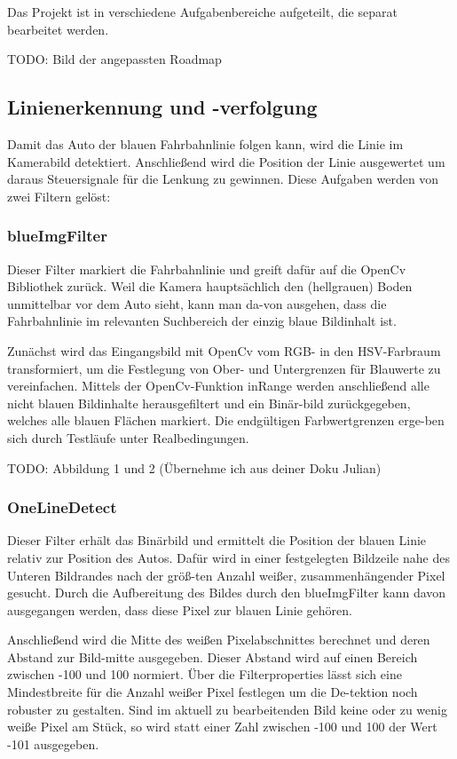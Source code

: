 \documentclass[12pt,a4paper]{report}
\begin{document}
Das Projekt ist in verschiedene Aufgabenbereiche aufgeteilt, die separat bearbeitet werden.

TODO: Bild der angepassten Roadmap

\subsection{Linienerkennung und -verfolgung}
Damit das Auto der blauen Fahrbahnlinie folgen kann, wird die Linie im Kamerabild detektiert. Anschließend wird die Position der Linie ausgewertet um daraus Steuersignale für die Lenkung zu gewinnen. Diese Aufgaben werden von zwei Filtern gelöst:

\subsubsection{blueImgFilter}
Dieser Filter markiert die Fahrbahnlinie und greift dafür auf die OpenCv Bibliothek zurück. Weil die Kamera hauptsächlich den (hellgrauen) Boden unmittelbar vor dem Auto sieht, kann man da-von ausgehen, dass die Fahrbahnlinie im relevanten Suchbereich der einzig blaue Bildinhalt ist.

Zunächst wird das Eingangsbild mit OpenCv vom RGB- in den HSV-Farbraum transformiert, um die Festlegung von Ober- und Untergrenzen für Blauwerte zu vereinfachen. Mittels der OpenCv-Funktion inRange werden anschließend alle nicht blauen Bildinhalte herausgefiltert und ein Binär-bild zurückgegeben, welches alle blauen Flächen markiert. Die endgültigen Farbwertgrenzen erge-ben sich durch Testläufe unter Realbedingungen.    

TODO: Abbildung 1 und 2 (Übernehme ich aus deiner Doku Julian)


\subsubsection{OneLineDetect}
Dieser Filter erhält das Binärbild und ermittelt die Position der blauen Linie relativ zur Position des Autos. Dafür wird in einer festgelegten Bildzeile nahe des Unteren Bildrandes nach der größ-ten Anzahl weißer, zusammenhängender Pixel gesucht. Durch die Aufbereitung des Bildes durch den blueImgFilter kann davon ausgegangen werden, dass diese Pixel zur blauen Linie gehören. 

Anschließend wird die Mitte des weißen Pixelabschnittes berechnet und deren Abstand zur Bild-mitte ausgegeben. Dieser Abstand wird auf einen Bereich zwischen -100 und 100 normiert. Über die Filterproperties lässt sich eine Mindestbreite für die Anzahl weißer Pixel festlegen um die De-tektion noch robuster zu gestalten. Sind im aktuell zu bearbeitenden Bild keine oder zu wenig weiße Pixel am Stück, so wird statt einer Zahl zwischen -100 und 100 der Wert -101 ausgegeben.
\end{document}
